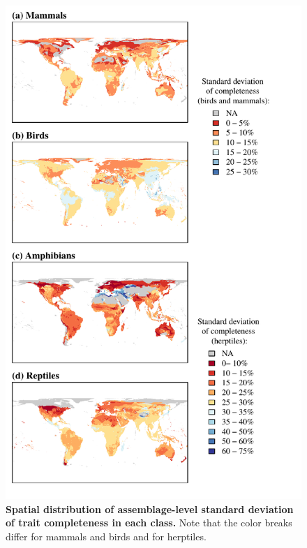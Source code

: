 \newpage
\begin{figure}[h!]
\vspace*{-2cm}
\centering
\includegraphics[scale=0.95]{Supporting/Chapter2/Figures/Maps/sd_map}
\caption[Spatial distribution of  assemblage-level standard deviation of trait completeness in each class]{\textbf{Spatial distribution of  assemblage-level standard deviation of trait completeness in each class.} Note that the color breaks differ for mammals and birds and for herptiles.}
\label{SI2_sdcomp_spatial}
\end{figure}


